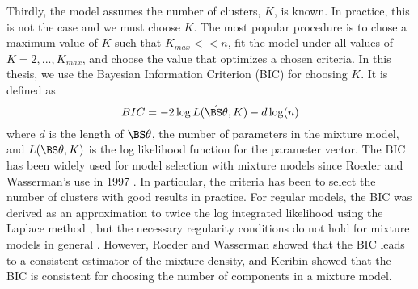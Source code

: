 Thirdly, the model assumes the number of clusters, $K$, is known. In practice, this is not the case and we must choose $K$. The most popular procedure is to chose a maximum value of $K$ such that $K_{max}<<n$, fit the model under all values of $K=2,...,K_{max}$, and choose the value that optimizes a chosen criteria. In this thesis, we use the Bayesian Information Criterion (BIC) \cite{schwarz1978} for choosing $K$. It is defined as
$$BIC = -2\log L(\hat{\BS\theta},K)- d\log(n)$$
where $d$ is the length of $\BS\theta$, the number of parameters in the mixture model, and $L(\BS\theta,K)$ is the log likelihood function for the parameter vector. The BIC has been widely used for model selection with mixture models since Roeder and Wasserman's use in 1997 \cite{roeder1997}. In particular, the criteria has been to select the number of clusters \cite{dasgupta1999,fraley1999} with good results in practice. For regular models, the BIC was derived as an approximation to twice the log integrated likelihood using the Laplace method \cite{tierney1986}, but the necessary regularity conditions do not hold for mixture models in general \cite{aitkin1985}. However, Roeder and Wasserman \cite{roeder1997} showed that the BIC leads to a consistent estimator of the mixture density, and Keribin \cite{keribin2000} showed that the BIC is consistent for choosing the number of components in a mixture model.

